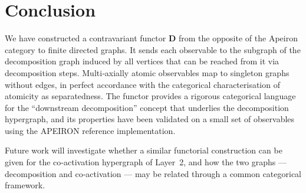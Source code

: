 \section{Conclusion}
We have constructed a contravariant functor \(\mathbf{D}\) from the opposite of the Apeiron category to finite directed graphs.
It sends each observable to the subgraph of the decomposition graph induced by all vertices that can be reached from it via decomposition steps.
Multi‑axially atomic observables map to singleton graphs without edges, in perfect accordance with the categorical characterisation of atomicity as separatedness.
The functor provides a rigorous categorical language for the “downstream decomposition” concept that underlies the decomposition hypergraph, and its properties have been validated on a small set of observables using the APEIRON reference implementation.

Future work will investigate whether a similar functorial construction can be given for the co‑activation hypergraph of Layer~2, and how the two graphs — decomposition and co‑activation — may be related through a common categorical framework.